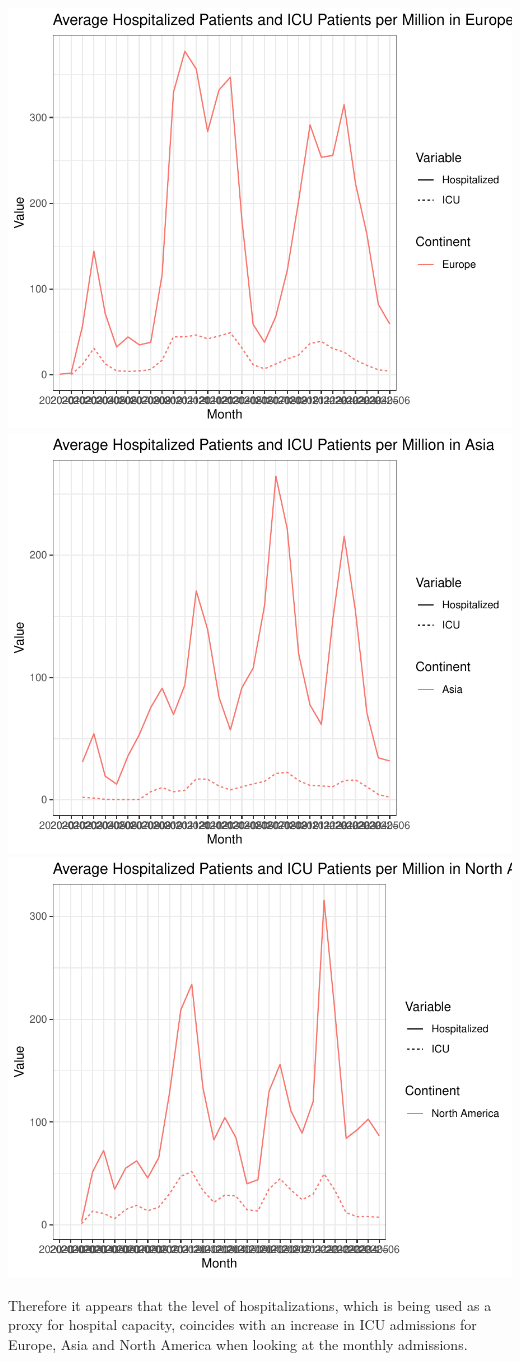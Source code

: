 \documentclass[11pt,preprint, authoryear]{elsarticle}
\numberwithin{equation}{section}
\numberwithin{figure}{section}
\numberwithin{table}{section}
\begin{document}
\includegraphics{Question_1_files/figure-latex/unnamed-chunk-10-1.pdf}
\includegraphics{Question_1_files/figure-latex/unnamed-chunk-10-2.pdf}
\includegraphics{Question_1_files/figure-latex/unnamed-chunk-10-3.pdf}

Therefore it appears that the level of hospitalizations, which is being
used as a proxy for hospital capacity, coincides with an increase in ICU
admissions for Europe, Asia and North America when looking at the
monthly admissions.


\end{document}
